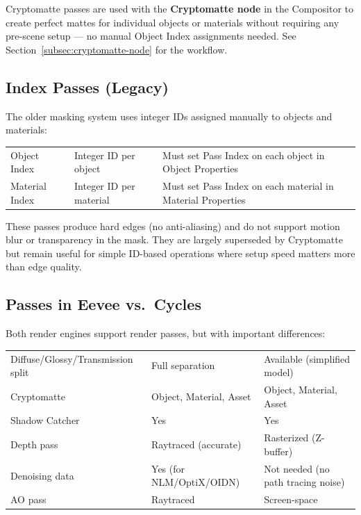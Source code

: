 Cryptomatte passes are used with the \textbf{Cryptomatte node} in the Compositor to create perfect mattes for individual objects or materials without requiring any pre-scene setup --- no manual Object Index assignments needed. See Section~\ref{subsec:cryptomatte-node} for the workflow.

\subsection{Index Passes (Legacy)}

The older masking system uses integer IDs assigned manually to objects and materials:

\vspace{0.5em}
\begin{tabularx}{\textwidth}{l X L{4cm}}
\toprule
{}
 &  &  \\
\midrule
Object Index & Integer ID per object & Must set Pass Index on each object in Object Properties \\
Material Index & Integer ID per material & Must set Pass Index on each material in Material Properties \\
\bottomrule
\end{tabularx}
\vspace{0.5em}

These passes produce hard edges (no anti-aliasing) and do not support motion blur or transparency in the mask. They are largely superseded by Cryptomatte but remain useful for simple ID-based operations where setup speed matters more than edge quality.

\subsection{Passes in Eevee vs.\ Cycles}

Both render engines support render passes, but with important differences:

\vspace{0.5em}
\begin{tabularx}{\textwidth}{l L{4cm} L{4cm}}
\toprule
{}
 &  &  \\
\midrule
Diffuse/Glossy/Transmission split & Full separation & Available (simplified model) \\
Cryptomatte & Object, Material, Asset & Object, Material, Asset \\
Shadow Catcher & Yes & Yes \\
Depth pass & Raytraced (accurate) & Rasterized (Z-buffer) \\
Denoising data & Yes (for NLM/OptiX/OIDN) & Not needed (no path tracing noise) \\
AO pass & Raytraced & Screen-space \\
\bottomrule
\end{tabularx}
\vspace{0.5em}

